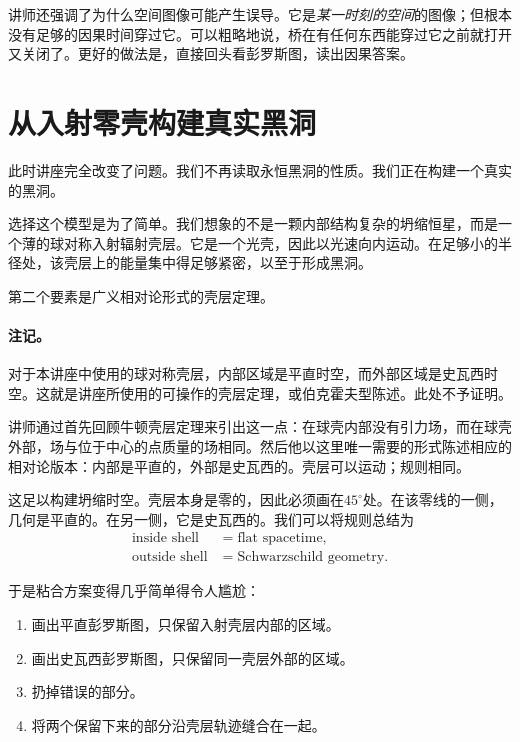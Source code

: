 讲师还强调了为什么空间图像可能产生误导。它是\emph{某一时刻的空间}的图像；但根本没有足够的因果时间穿过它。可以粗略地说，桥在有任何东西能穿过它之前就打开又关闭了。更好的做法是，直接回头看彭罗斯图，读出因果答案。

\section{从入射零壳构建真实黑洞}

此时讲座完全改变了问题。我们不再读取永恒黑洞的性质。我们正在构建一个真实的黑洞。

选择这个模型是为了简单。我们想象的不是一颗内部结构复杂的坍缩恒星，而是一个薄的球对称入射辐射壳层。它是一个光壳，因此以光速向内运动。在足够小的半径处，该壳层上的能量集中得足够紧密，以至于形成黑洞。

第二个要素是广义相对论形式的壳层定理。

\paragraph{注记。} 对于本讲座中使用的球对称壳层，内部区域是平直时空，而外部区域是史瓦西时空。这就是讲座所使用的可操作的壳层定理，或伯克霍夫型陈述。此处不予证明。

讲师通过首先回顾牛顿壳层定理来引出这一点：在球壳内部没有引力场，而在球壳外部，场与位于中心的点质量的场相同。然后他以这里唯一需要的形式陈述相应的相对论版本：内部是平直的，外部是史瓦西的。壳层可以运动；规则相同。

这足以构建坍缩时空。壳层本身是零的，因此必须画在\(45^\circ\)处。在该零线的一侧，几何是平直的。在另一侧，它是史瓦西的。我们可以将规则总结为
\begin{equation}
\begin{aligned}
\text{inside shell} &= \text{flat spacetime},\\
\text{outside shell} &= \text{Schwarzschild geometry}.
\end{aligned}
\end{equation}

于是粘合方案变得几乎简单得令人尴尬：

\begin{enumerate}
\item 画出平直彭罗斯图，只保留入射壳层内部的区域。
\item 画出史瓦西彭罗斯图，只保留同一壳层外部的区域。
\item 扔掉错误的部分。
\item 将两个保留下来的部分沿壳层轨迹缝合在一起。
\end{enumerate}


